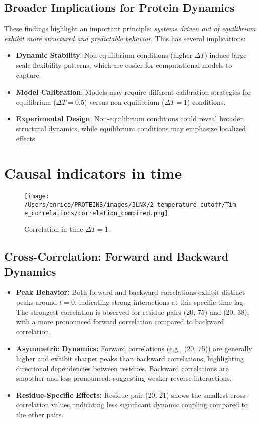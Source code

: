 \documentclass[English, Lau, oneside]{sapthesis}
\begin{document}
\subsection{Broader Implications for Protein Dynamics}
These findings highlight an important principle: \textit{systems driven out of equilibrium exhibit more structured and predictable behavior}. This has several implications:
\begin{itemize}
    \item \textbf{Dynamic Stability}: Non-equilibrium conditions (higher \(\Delta T\)) induce large-scale flexibility patterns, which are easier for computational models to capture.
    \item \textbf{Model Calibration}: Models may require different calibration strategies for equilibrium (\(\Delta T = 0.5\)) versus non-equilibrium (\(\Delta T = 1\)) conditions.
    \item \textbf{Experimental Design}: Non-equilibrium conditions could reveal broader structural dynamics, while equilibrium conditions may emphasize localized effects.
\end{itemize}

\newpage
\section{Causal indicators in time}

\begin{figure}[h!]
    \centering
    \texttt{[image: /Users/enrico/PROTEINS/images/3LNX/2\_temperature\_cutoff/Time\_correlations/correlation\_combined.png]}
    \caption{Correlation in time $\Delta T = 1$.}
\end{figure}
\subsection{Cross-Correlation: Forward and Backward Dynamics}
\begin{itemize}
    \item \textbf{Peak Behavior:} Both forward and backward correlations exhibit distinct peaks around \(t = 0\), indicating strong interactions at this specific time lag. The strongest correlation is observed for residue pairs (20, 75) and (20, 38), with a more pronounced forward correlation compared to backward correlation.
    \item \textbf{Asymmetric Dynamics:} Forward correlations (e.g., (20, 75)) are generally higher and exhibit sharper peaks than backward correlations, highlighting directional dependencies between residues. Backward correlations are smoother and less pronounced, suggesting weaker reverse interactions.
    \item \textbf{Residue-Specific Effects:} Residue pair (20, 21) shows the smallest cross-correlation values, indicating less significant dynamic coupling compared to the other pairs.
\end{itemize}
\end{document}
